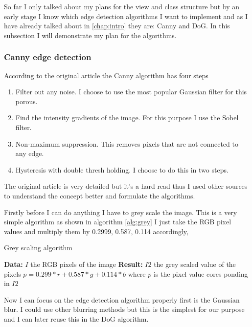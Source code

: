 So far I only talked about my plans for the view and class structure but by an early stage I know which edge detection algorithms I want to implement and as I have already talked about in \autoref{chap:intro} they are: \ac{Canny} and \ac{DoG}. In this subsection I will demonstrate my plan for the algorithms.

\subsubsection{Canny edge detection}

According to the original article\cite{canny:paper} the \ac{Canny} algorithm has four steps

\begin{enumerate}[nolistsep]
\item Filter out any noise. I choose to use the most popular Gaussian filter for this porous.
\item Find the intensity gradients of the image. For this purpose I use the Sobel filter.
\item Non-maximum suppression. This removes pixels that are not connected to any edge.
\item Hysteresis with double thresh holding. I choose to do this in two steps.
\end{enumerate}

The original article\cite{canny:paper} is very detailed but it's a hard read thus I used other sources\cite{canny:imp}\cite{canny:imp2} to understand the concept better and formulate the algorithms.

Firstly before I can do anything I have to grey scale the image. This is a very simple algorithm as shown in algorithm \ref{alg:grey} I just take the RGB pixel values and multiply them by 0.2999, 0.587, 0.114 accordingly,

\begin{algorithm}[H]
\caption{Grey scaling algorithm}
\label{alg:grey}
\begin{algorithmic}
\State \textbf{Data:} $I$ the RGB pixels of the image
\State \textbf{Result:} $I2$ the grey scaled value of the pixels
\State $p = 0.299 * r + 0.587 * g + 0.114 * b$
\State where $p$ is the pixel value cores ponding in $I2$
\EndFor
\end{algorithmic}
\end{algorithm}

Now I can focus on the edge detection algorithm properly first is the Gaussian blur. I could use other blurring methods but this is the simplest for our purpose and I can later reuse this in the \ac{DoG} algorithm.

